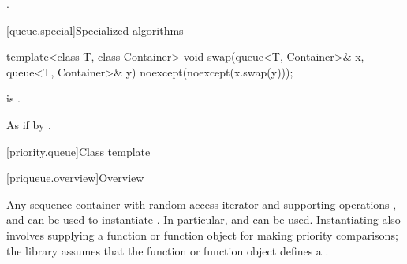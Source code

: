 \begin{itemdescr}
\pnum
\returns
{}.
\end{itemdescr}

[queue.special]{Specialized algorithms}

%
\begin{itemdecl}
template<class T, class Container>
  void swap(queue<T, Container>& x, queue<T, Container>& y) noexcept(noexcept(x.swap(y)));
\end{itemdecl}

\begin{itemdescr}
\pnum
\constraints
{} is .

\pnum
\effects
As if by .
\end{itemdescr}

[priority.queue]{Class template }

[priqueue.overview]{Overview}

\pnum
{}%
Any sequence container with random access iterator and supporting operations
,
and
can be used to instantiate
.
In particular,
and
can be used.
Instantiating
also involves supplying a function or function object for making
priority comparisons; the library assumes that the function or function
object defines a .

